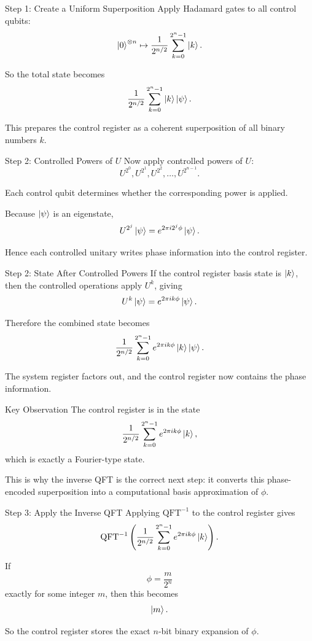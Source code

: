\documentclass{beamer}
\begin{document}
\begin{frame}{Step 1: Create a Uniform Superposition}
Apply Hadamard gates to all control qubits:
\[
\ket{0}^{\otimes n}
\mapsto
\frac{1}{2^{n/2}}
\sum_{k=0}^{2^n-1}\ket{k}.
\]

So the total state becomes
\[
\frac{1}{2^{n/2}}
\sum_{k=0}^{2^n-1}
\ket{k}\ket{\psi}.
\]

This prepares the control register as a coherent superposition of all binary numbers \(k\).
\end{frame}

\begin{frame}{Step 2: Controlled Powers of \(U\)}
Now apply controlled powers of \(U\):
\[
U^{2^0}, U^{2^1}, U^{2^2}, \dots, U^{2^{n-1}}.
\]

Each control qubit determines whether the corresponding power is applied.

Because \(\ket{\psi}\) is an eigenstate,
\[
U^{2^j}\ket{\psi} = e^{2\pi i 2^j \phi}\ket{\psi}.
\]

Hence each controlled unitary writes phase information into the control register.
\end{frame}

\begin{frame}{Step 2: State After Controlled Powers}
If the control register basis state is \(\ket{k}\), then the controlled operations apply \(U^k\), giving
\[
U^k\ket{\psi} = e^{2\pi i k\phi}\ket{\psi}.
\]

Therefore the combined state becomes
\[
\frac{1}{2^{n/2}}
\sum_{k=0}^{2^n-1}
e^{2\pi i k\phi}\ket{k}\ket{\psi}.
\]

The system register factors out, and the control register now contains the phase information.
\end{frame}

\begin{frame}{Key Observation}
The control register is in the state
\[
\frac{1}{2^{n/2}}
\sum_{k=0}^{2^n-1} e^{2\pi i k\phi}\ket{k},
\]
which is exactly a Fourier-type state.

This is why the inverse QFT is the correct next step:
it converts this phase-encoded superposition into a computational basis approximation of \(\phi\).
\end{frame}

\begin{frame}{Step 3: Apply the Inverse QFT}
Applying \(\mathrm{QFT}^{-1}\) to the control register gives
\[
\mathrm{QFT}^{-1}
\left(
\frac{1}{2^{n/2}}
\sum_{k=0}^{2^n-1} e^{2\pi i k\phi}\ket{k}
\right).
\]

If
\[
\phi = \frac{m}{2^n}
\]
exactly for some integer \(m\), then this becomes
\[
\ket{m}.
\]

So the control register stores the exact \(n\)-bit binary expansion of \(\phi\).
\end{frame}
\end{document}

